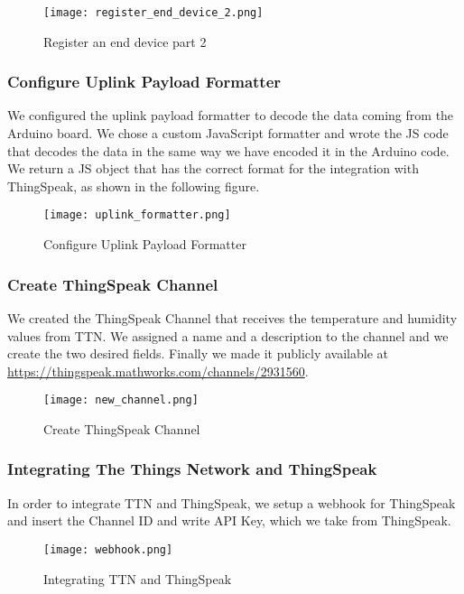 \begin{figure}[H]
    \centering
    \texttt{[image: register\_end\_device\_2.png]}
    \caption{Register an end device part 2}
\end{figure}

\subsubsection{Configure Uplink Payload Formatter}
We configured the uplink payload formatter to decode the data coming from the Arduino board. We chose a custom JavaScript formatter and wrote the JS code that decodes the data in the same way we have encoded it in the Arduino code. We return a JS object that has the correct format for the integration with ThingSpeak, as shown in the following figure.

\begin{figure}[H]
    \centering
    \texttt{[image: uplink\_formatter.png]}
    \caption{Configure Uplink Payload Formatter}
\end{figure}

\subsubsection{Create ThingSpeak Channel}
We created the ThingSpeak Channel that receives the temperature and humidity values from TTN. We assigned a name and a description to the channel and we create the two desired fields. Finally we made it publicly available at \url{https://thingspeak.mathworks.com/channels/2931560}.

\begin{figure}[H]
    \centering
    \texttt{[image: new\_channel.png]}
    \caption{Create ThingSpeak Channel}
\end{figure}

\subsubsection{Integrating The Things Network and ThingSpeak}
In order to integrate TTN and ThingSpeak, we setup a webhook for ThingSpeak and insert the Channel ID and write API Key, which we take from ThingSpeak.

\begin{figure}[H]
    \centering
    \texttt{[image: webhook.png]}
    \caption{Integrating TTN and ThingSpeak}
\end{figure}

